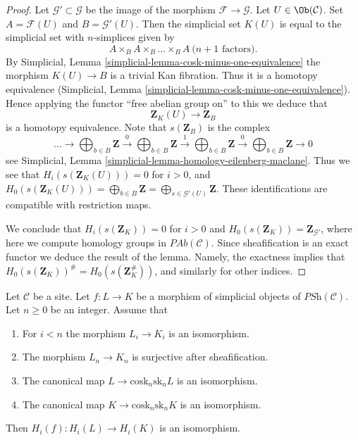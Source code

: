 \begin{proof}
Let $\mathcal{G}' \subset \mathcal{G}$ be the image of
the morphism $\mathcal{F} \to \mathcal{G}$.
Let $U \in \Ob(\mathcal{C})$. Set
$A = \mathcal{F}(U)$ and $B = \mathcal{G}'(U)$.
Then the simplicial set $K(U)$ is equal to the simplicial
set with $n$-simplices given by
$$
A \times_B A \times_B \ldots \times_B A\ (n + 1 \text{ factors)}.
$$
By Simplicial, Lemma \ref{simplicial-lemma-cosk-minus-one-equivalence}
the morphism $K(U) \to B$ is a trivial Kan fibration.
Thus it is a homotopy equivalence
(Simplicial, Lemma \ref{simplicial-lemma-cosk-minus-one-equivalence}).
Hence applying the functor ``free abelian group on'' to this
we deduce that
$$
\mathbf{Z}_K(U) \longrightarrow \mathbf{Z}_B
$$
is a homotopy equivalence. Note that $s(\mathbf{Z}_B)$ is
the complex
$$
\ldots \to
\bigoplus\nolimits_{b \in B}\mathbf{Z} \xrightarrow{0}
\bigoplus\nolimits_{b \in B}\mathbf{Z} \xrightarrow{1}
\bigoplus\nolimits_{b \in B}\mathbf{Z} \xrightarrow{0}
\bigoplus\nolimits_{b \in B}\mathbf{Z} \to 0
$$
see Simplicial, Lemma \ref{simplicial-lemma-homology-eilenberg-maclane}.
Thus we see that
$H_i(s(\mathbf{Z}_K(U))) = 0$ for $i > 0$, and
$H_0(s(\mathbf{Z}_K(U))) = \bigoplus_{b \in B}\mathbf{Z}
= \bigoplus_{s \in \mathcal{G}'(U)} \mathbf{Z}$.
These identifications are compatible with restriction
maps.

\medskip\noindent
We conclude that $H_i(s(\mathbf{Z}_K)) = 0$ for $i > 0$ and
$H_0(s(\mathbf{Z}_K)) = \mathbf{Z}_{\mathcal{G}'}$, where here
we compute homology groups in $\textit{PAb}(\mathcal{C})$. Since
sheafification is an exact functor we deduce the result
of the lemma. Namely, the exactness implies
that $H_0(s(\mathbf{Z}_K))^\# = H_0(s(\mathbf{Z}_K^\#))$,
and similarly for other indices.
\end{proof}

\begin{lemma}
\label{lemma-acyclicity}
Let $\mathcal{C}$ be a site.
Let $f : L \to K$ be a morphism of
simplicial objects of $\textit{PSh}(\mathcal{C})$.
Let $n \geq 0$ be an integer.
Assume that
\begin{enumerate}
\item For $i < n$ the morphism $L_i \to K_i$ is an isomorphism.
\item The morphism $L_n \to K_n$ is surjective after sheafification.
\item The canonical map $L \to \text{cosk}_n \text{sk}_n L$ is an isomorphism.
\item The canonical map $K \to \text{cosk}_n \text{sk}_n K$ is an isomorphism.
\end{enumerate}
Then $H_i(f) : H_i(L) \to H_i(K)$ is an isomorphism.
\end{lemma}

